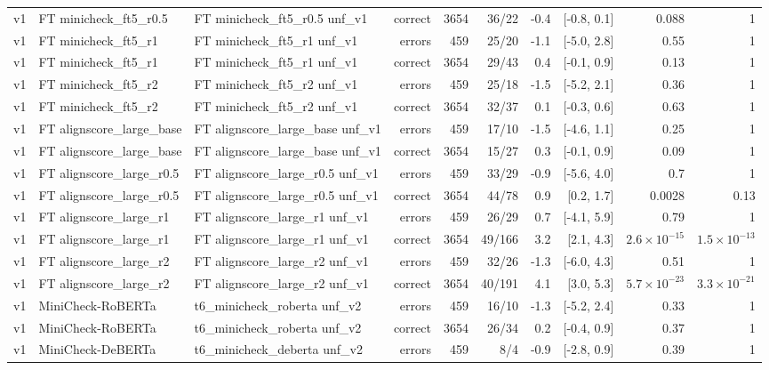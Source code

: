 \begin{scriptsize}
\begin{longtable}{lllrrrrrrr}
v1 & FT minicheck\_ft5\_r0.5 & FT minicheck\_ft5\_r0.5 unf\_v1 & correct & 3654 & 36/22 & -0.4 & [-0.8, 0.1] & 0.088 & 1 \\
v1 & FT minicheck\_ft5\_r1 & FT minicheck\_ft5\_r1 unf\_v1 & errors & 459 & 25/20 & -1.1 & [-5.0, 2.8] & 0.55 & 1 \\
v1 & FT minicheck\_ft5\_r1 & FT minicheck\_ft5\_r1 unf\_v1 & correct & 3654 & 29/43 & 0.4 & [-0.1, 0.9] & 0.13 & 1 \\
v1 & FT minicheck\_ft5\_r2 & FT minicheck\_ft5\_r2 unf\_v1 & errors & 459 & 25/18 & -1.5 & [-5.2, 2.1] & 0.36 & 1 \\
v1 & FT minicheck\_ft5\_r2 & FT minicheck\_ft5\_r2 unf\_v1 & correct & 3654 & 32/37 & 0.1 & [-0.3, 0.6] & 0.63 & 1 \\
v1 & FT alignscore\_large\_base & FT alignscore\_large\_base unf\_v1 & errors & 459 & 17/10 & -1.5 & [-4.6, 1.1] & 0.25 & 1 \\
v1 & FT alignscore\_large\_base & FT alignscore\_large\_base unf\_v1 & correct & 3654 & 15/27 & 0.3 & [-0.1, 0.9] & 0.09 & 1 \\
v1 & FT alignscore\_large\_r0.5 & FT alignscore\_large\_r0.5 unf\_v1 & errors & 459 & 33/29 & -0.9 & [-5.6, 4.0] & 0.7 & 1 \\
v1 & FT alignscore\_large\_r0.5 & FT alignscore\_large\_r0.5 unf\_v1 & correct & 3654 & 44/78 & 0.9 & [0.2, 1.7] & 0.0028 & 0.13 \\
v1 & FT alignscore\_large\_r1 & FT alignscore\_large\_r1 unf\_v1 & errors & 459 & 26/29 & 0.7 & [-4.1, 5.9] & 0.79 & 1 \\
v1 & FT alignscore\_large\_r1 & FT alignscore\_large\_r1 unf\_v1 & correct & 3654 & 49/166 & 3.2 & [2.1, 4.3] & $2.6\times10^{-15}$ & $1.5\times10^{-13}$ \\
v1 & FT alignscore\_large\_r2 & FT alignscore\_large\_r2 unf\_v1 & errors & 459 & 32/26 & -1.3 & [-6.0, 4.3] & 0.51 & 1 \\
v1 & FT alignscore\_large\_r2 & FT alignscore\_large\_r2 unf\_v1 & correct & 3654 & 40/191 & 4.1 & [3.0, 5.3] & $5.7\times10^{-23}$ & $3.3\times10^{-21}$ \\
v1 & MiniCheck-RoBERTa & t6\_minicheck\_roberta unf\_v2 & errors & 459 & 16/10 & -1.3 & [-5.2, 2.4] & 0.33 & 1 \\
v1 & MiniCheck-RoBERTa & t6\_minicheck\_roberta unf\_v2 & correct & 3654 & 26/34 & 0.2 & [-0.4, 0.9] & 0.37 & 1 \\
v1 & MiniCheck-DeBERTa & t6\_minicheck\_deberta unf\_v2 & errors & 459 & 8/4 & -0.9 & [-2.8, 0.9] & 0.39 & 1 \\

\end{longtable}
\end{scriptsize}
